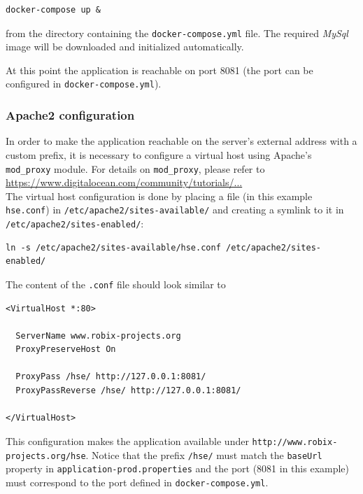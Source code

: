 \documentclass[fleqn]{article}
\begin{document}
\begin{verbatim}
docker-compose up &
\end{verbatim}

from the directory containing the \texttt{docker-compose.yml} file. The required \emph{MySql} image will
be downloaded and initialized automatically.

At this point the application is reachable on port 8081 (the port can be configured in \texttt{docker-compose.yml}).

\subsubsection{Apache2 configuration}

In order to make the application reachable on the server's external address with a custom prefix, it is necessary to
configure a virtual host using Apache's \texttt{mod\_proxy} module. For details on \texttt{mod\_proxy}, please
refer to \\ \href{https://www.digitalocean.com/community/tutorials/how-to-use-apache-http-server-as-reverse-proxy-using-mod_proxy-extension}{https://www.digitalocean.com/community/tutorials/...} \\

The virtual host configuration is done by placing a file (in this example \texttt{hse.conf}) in \texttt{/etc/apache2/sites-available/} and creating
a symlink to it in \texttt{/etc/apache2/sites-enabled/}:

\begin{verbatim}
ln -s /etc/apache2/sites-available/hse.conf /etc/apache2/sites-enabled/
\end{verbatim}

The content of the \texttt{.conf} file should look similar to

\begin{verbatim}
<VirtualHost *:80>

  ServerName www.robix-projects.org
  ProxyPreserveHost On

  ProxyPass /hse/ http://127.0.0.1:8081/
  ProxyPassReverse /hse/ http://127.0.0.1:8081/

</VirtualHost>
\end{verbatim}

This configuration makes the application available under \texttt{http://www.robix-projects.org/hse}. Notice that
the prefix \texttt{/hse/} must match the \texttt{baseUrl} property in \texttt{application-prod.properties}
and the port (8081 in this example) must correspond to the port defined in \texttt{docker-compose.yml}. 
\end{document}
